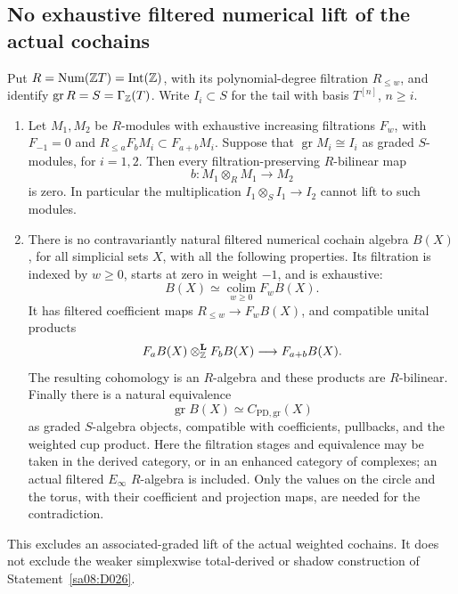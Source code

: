 \subsection{No exhaustive filtered numerical lift of the actual cochains}

\begin{theorem}
\label{sa08:A026}
Put \(R=\operatorname{Num}(\mathbb Z T)=\operatorname{Int}(\mathbb Z)\), with its
polynomial-degree filtration \(R_{\le w}\), and identify
\(\operatorname{gr}R=S=\Gamma_{\mathbb Z}(T)\). Write \(I_i\subset S\) for
the tail with basis \(T^{[n]}\), \(n\ge i\).
\begin{enumerate}
\item Let \(M_1,M_2\) be \(R\)-modules with exhaustive increasing
filtrations \(F_w\), with \(F_{-1}=0\) and
\(R_{\le a}F_bM_i\subset F_{a+b}M_i\). Suppose that
\(\operatorname{gr}M_i\cong I_i\) as graded \(S\)-modules, for
\(i=1,2\). Then every filtration-preserving \(R\)-bilinear map
\[
 b:M_1\otimes_R M_1\longrightarrow M_2
\]
is zero. In particular the multiplication
\(I_1\otimes_S I_1\to I_2\) cannot lift to such modules.

\item There is no contravariantly natural filtered numerical
cochain algebra \(B(X)\), for all simplicial sets \(X\), with all
the following properties. Its filtration is indexed by \(w\ge0\),
starts at zero in weight \(-1\), and is exhaustive:
\[
 B(X)\simeq\operatorname*{colim}_{w\ge0}F_wB(X).
\]
It has filtered coefficient maps
\(R_{\le w}\to F_wB(X)\), and compatible unital products
\[
 F_aB(X)\otimes^{\mathbf L}_{\mathbb Z}F_bB(X)
       \longrightarrow F_{a+b}B(X).
\]
The resulting cohomology is an \(R\)-algebra and these products
are \(R\)-bilinear. Finally there is a natural equivalence
\[
 \operatorname{gr}B(X)\simeq C_{\mathrm{PD},\mathrm{gr}}(X)
 \tag{A-26a}
 \]
as graded \(S\)-algebra objects, compatible with coefficients,
pullbacks, and the weighted cup product.
Here the filtration stages and equivalence may be taken in the
derived category, or in an enhanced category of complexes;
an actual filtered \(E_\infty\) \(R\)-algebra is included.
Only the values on the circle and the torus, with their
coefficient and projection maps, are needed for the contradiction.
\end{enumerate}
This excludes an associated-graded lift of the actual weighted
cochains. It does not exclude the weaker simplexwise total-derived
or shadow construction of Statement~\ref{sa08:D026}.
\end{theorem}

